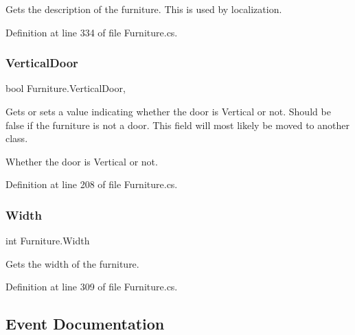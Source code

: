 Gets the description of the furniture. This is used by localization. 



Definition at line 334 of file Furniture.\+cs.

\mbox{\label{class_furniture_ad071451038dfba3b911fee3067ea4981}} 
\subsubsection{\texorpdfstring{Vertical\+Door}{VerticalDoor}}
{\footnotesize\ttfamily bool Furniture.\+Vertical\+Door\hspace{0.3cm}{\ttfamily [get]}, {\ttfamily [set]}}



Gets or sets a value indicating whether the door is Vertical or not. Should be false if the furniture is not a door. This field will most likely be moved to another class. 

Whether the door is Vertical or not.

Definition at line 208 of file Furniture.\+cs.

\mbox{\label{class_furniture_ae25de1a4dc2d70f8f8ab39a66aff60c2}} 
\subsubsection{\texorpdfstring{Width}{Width}}
{\footnotesize\ttfamily int Furniture.\+Width\hspace{0.3cm}{\ttfamily [get]}}



Gets the width of the furniture. 



Definition at line 309 of file Furniture.\+cs.



\subsection{Event Documentation}
\mbox{\label{class_furniture_a5d5652c9eac3ef6e0cf796eaf3cc9a67}} 
